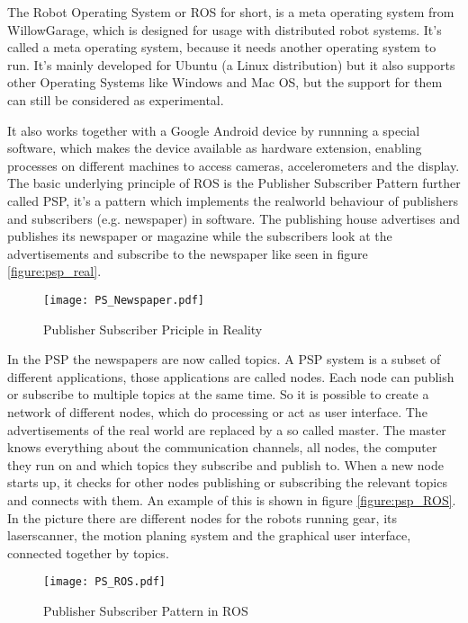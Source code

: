 The Robot Operating System or ROS for short, is a meta operating system from WillowGarage, which is designed for usage with distributed 
robot systems. It's called a meta operating system, because it needs another operating system to run. It's mainly developed for Ubuntu 
(a Linux distribution) but it also supports other Operating Systems like Windows and Mac OS, but the support for them can still be considered 
as experimental. 

It also works together with a Google Android device by runnning a special software, which makes the device available
as hardware extension, enabling processes on different machines to access cameras, accelerometers and the display.
The basic underlying principle of ROS is the Publisher Subscriber Pattern further called PSP, it's a pattern which 
implements the realworld behaviour of publishers and subscribers (e.g. newspaper) in software. 
The publishing house advertises and publishes its newspaper or magazine while the subscribers look at the advertisements
and subscribe to the newspaper like seen in figure \vref{figure:psp_real}.

\begin{figure}[htp]
	\centering
	\texttt{[image: PS\_Newspaper.pdf]}
	\caption{Publisher Subscriber Priciple in Reality}
	\label{figure:psp_real}
\end{figure} 


In the PSP the newspapers are now called topics. A PSP system is a subset of different applications, those applications are called nodes.  
Each node can publish or subscribe to multiple topics at the same time. So it is possible to create a network of different nodes, which
do processing or act as user interface. The advertisements of the real world are replaced by a so called master. 
The master knows everything about the communication channels, all nodes, the computer they run on and 
which topics they subscribe and publish to. When a new node starts up, it checks for other nodes publishing or subscribing the relevant topics
and connects with them. An example of this is shown in figure \vref{figure:psp_ROS}.
In the picture there are different nodes for the robots running gear, its laserscanner, the motion planing system and the graphical user interface,
connected together by topics.

\begin{figure}[htp]
	\centering
	\texttt{[image: PS\_ROS.pdf]}
	\caption{Publisher Subscriber Pattern in ROS}
	\label{figure:psp_ROS}
\end{figure} 

